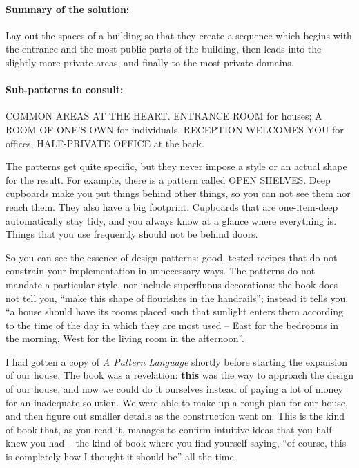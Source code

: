 \paragraph*{Summary of the solution:}
Lay out the spaces of a building so that they create a sequence which begins
with the entrance and the most public parts of the building, then leads into the
slightly more private areas, and finally to the most private domains.

\paragraph*{Sub-patterns to consult:} COMMON AREAS AT THE HEART. ENTRANCE ROOM
for houses; A ROOM OF ONE'S OWN for individuals. RECEPTION WELCOMES YOU for
offices, HALF-PRIVATE OFFICE at the back.

The patterns get quite specific, but they never impose a style or an actual
shape for the result. For example, there is a pattern called OPEN SHELVES. Deep
cupboards make you put things behind other things, so you can not see them nor
reach them. They also have a big footprint. Cupboards that are one-item-deep
automatically stay tidy, and you always know at a glance where everything is.
Things that you use frequently should not be behind doors.

So you can see the essence of design patterns: good, tested recipes that do not
constrain your implementation in unnecessary ways. The patterns do not mandate
a particular style, nor include superfluous decorations: the book does not tell
you, ``make this shape of flourishes in the handrails''; instead it tells you,
``a house should have its rooms placed such that sunlight enters them according
to the time of the day in which they are most used -- East for the bedrooms in
the morning, West for the living room in the afternoon''.

I had gotten a copy of \textit{A Pattern Language} shortly before starting the
expansion of our house. The book was a revelation:  \textbf{this} was the way to
approach the design of our house, and now we could do it ourselves instead of
paying a lot of money for an inadequate solution. We were able to make up a
rough plan for our house, and then figure out smaller details as the
construction went on. This is the kind of book that, as you read it, manages to
confirm intuitive ideas that you half-knew you had -- the kind of book where you
find yourself saying, ``of course, this is completely how I thought it should
be'' all the time.

